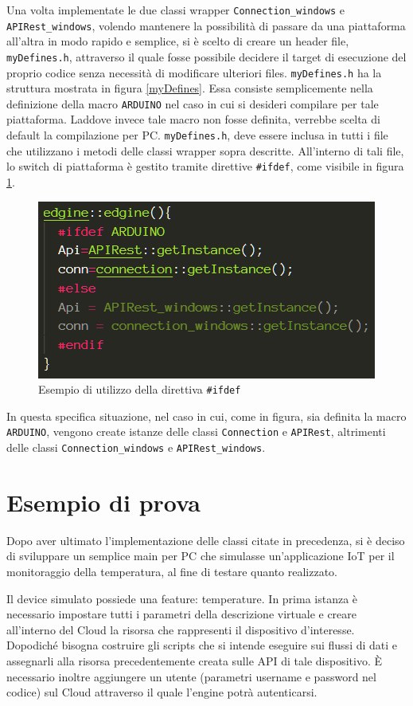Una volta implementate le due classi wrapper \texttt{Connection\_windows} e \\\texttt{APIRest\_windows}, volendo mantenere la possibilità di passare da una piattaforma all'altra in modo rapido e semplice, si è scelto di creare un header file, \texttt{myDefines.h}, attraverso il quale fosse possibile decidere il target di esecuzione del proprio codice senza necessità di modificare ulteriori files. \texttt{myDefines.h} ha la struttura mostrata in figura \ref{myDefines}. Essa consiste semplicemente nella definizione della macro \texttt{ARDUINO} nel caso in cui si desideri compilare per tale piattaforma. Laddove invece tale macro non fosse definita, verrebbe scelta di default la compilazione per PC. \texttt{myDefines.h}, deve essere inclusa in tutti i file che utilizzano i metodi delle classi wrapper sopra descritte. All'interno di tali file, lo switch di piattaforma è gestito tramite direttive \texttt{\#ifdef}, come visibile in figura \ref{ifdef}.

\begin{figure}[H]
	\centering
	\includegraphics[width=0.66\linewidth]{pics/ifdef}
	\caption{Esempio di utilizzo della direttiva \texttt{\#ifdef}}
	\label{ifdef}
\end{figure}

In questa specifica situazione, nel caso in cui, come in figura, sia definita la macro \texttt{ARDUINO}, vengono create istanze delle classi \texttt{Connection} e \texttt{APIRest}, altrimenti delle classi \texttt{Connection\_windows} e \texttt{APIRest\_windows}.
\section{Esempio di prova}\label{prova}
Dopo aver ultimato l’implementazione delle classi citate in precedenza, si è deciso di sviluppare un semplice main per PC che simulasse un’applicazione IoT per il monitoraggio della temperatura, al fine di testare quanto realizzato.

Il device simulato possiede una feature: temperature. In prima istanza è necessario impostare tutti i parametri della descrizione virtuale e creare all'interno del Cloud la risorsa che rappresenti il dispositivo d’interesse. Dopodiché bisogna costruire gli scripts che si intende eseguire sui flussi di dati e assegnarli alla risorsa precedentemente creata sulle API di tale dispositivo. È necessario inoltre aggiungere un utente (parametri username e password nel codice) sul Cloud attraverso il quale l'engine potrà autenticarsi.

